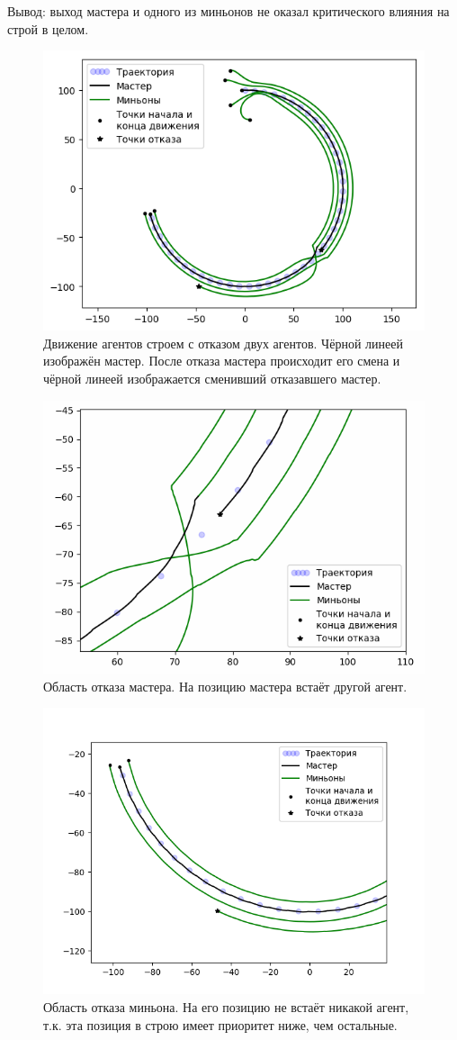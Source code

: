 \documentclass[a4paper, 14pt]{extarticle}
\begin{document}
Вывод: выход мастера и одного из миньонов не оказал критического влияния на строй в целом.
\begin{figure}
	\centering
	\includegraphics[width=0.7\linewidth]{platoon/with-crashes}
	\caption{Движение агентов строем с отказом двух агентов. Чёрной линеей изображён мастер. После отказа мастера происходит его смена и чёрной линеей изображается сменивший отказавшего мастер. }
	\label{fig:with-crashes}
\end{figure}
\begin{figure}
	\centering
	\includegraphics[width=0.7\linewidth]{platoon/with-crashes-zoom3}
	\caption{Область отказа мастера. На позицию мастера встаёт другой агент.}
	\label{fig:with-crashes-zoom3}
\end{figure}
\begin{figure}
	\centering
	\includegraphics[width=0.7\linewidth]{platoon/with-crashes-zoom1}
	\caption{Область отказа миньона. На его позицию не встаёт никакой агент, т.к. эта позиция в строю имеет приоритет ниже, чем остальные.}
	\label{fig:with-crashes-zoom1}
\end{figure}
\end{document}
